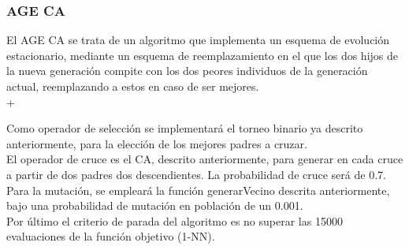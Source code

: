 \subsubsection{AGE CA}
El AGE CA se trata de un algoritmo que implementa un esquema de evolución estacionario, mediante un esquema de reemplazamiento en el que los dos hijos de la nueva generación compite con los dos peores individuos de la generación actual, reemplazando a estos en caso de ser mejores.\\ +

Como operador de selección se implementará el torneo binario ya descrito anteriormente, para la elección de los mejores padres a cruzar.\\ 

El operador de cruce es el CA, descrito anteriormente, para generar en cada cruce a partir de dos padres dos descendientes. La probabilidad de cruce será de 0.7.\\ 

Para la mutación, se empleará la función generarVecino descrita anteriormente, bajo una probabilidad de mutación en población de un 0.001.\\ 

Por último el criterio de parada del algoritmo es no superar las 15000 evaluaciones de la función objetivo (1-NN).


